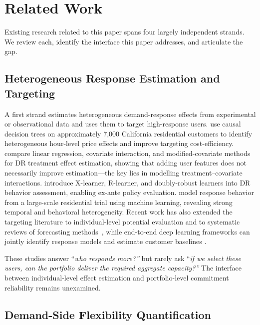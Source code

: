 \documentclass[utf8]{FrontiersinHarvard}
\begin{document}
\section{Related Work}
\label{sec:related}

Existing research related to this paper spans four largely
independent strands. We review each, identify the interface
this paper addresses, and articulate the gap.

\subsection{Heterogeneous Response Estimation and Targeting}
\label{subsec:rw_hte}

A first strand estimates heterogeneous demand-response effects
from experimental or observational data and uses them to target
high-response users. \citep{zhou2017estimating} use causal
decision trees on approximately 7{,}000 California residential
customers to identify heterogeneous hour-level price effects and
improve targeting cost-efficiency.
\citep{li2017linear} compare linear regression, covariate
interaction, and modified-covariate methods for DR treatment
effect estimation, showing that adding user features does not
necessarily improve estimation---the key lies in modelling
treatment--covariate interactions.
\citep{he2024behavior} introduce X-learner, R-learner, and
doubly-robust learners into DR behavior assessment, enabling
ex-ante policy evaluation.
\citep{antonopoulos2021data} model response behavior from a
large-scale residential trial using machine learning, revealing
strong temporal and behavioral heterogeneity.
Recent work has also extended the targeting literature to
individual-level potential evaluation
\citep{jiao2023individual} and to systematic reviews of
forecasting methods~\citep{muqtadir2025drpotential}, while
end-to-end deep learning frameworks can jointly identify
response models and estimate customer baselines
\citep{chen2021endtoend}.

These studies answer ``\textit{who responds more?''} but rarely
ask ``\textit{if we select these users, can the portfolio
deliver the required aggregate capacity?''} The interface
between individual-level effect estimation and portfolio-level
commitment reliability remains unexamined.

\subsection{Demand-Side Flexibility Quantification}
\label{subsec:rw_flex}
\end{document}
